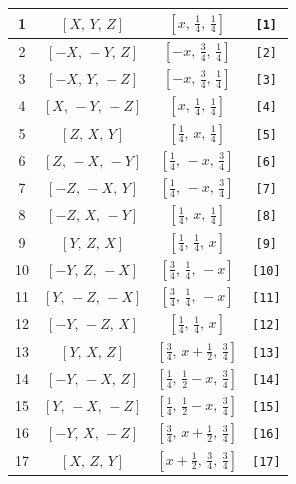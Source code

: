 \documentclass[fleqn,8pt]{jsarticle}
\begin{document}
\begin{longtable}{cccc}
1 & $\left[ X,\, Y,\, Z \right]$ & $\left[ x,\, \frac{1}{4},\, \frac{1}{4} \right]$ & {\tt [1]} \\ \hline
2 & $\left[ - X,\, - Y,\, Z \right]$ & $\left[ - x,\, \frac{3}{4},\, \frac{1}{4} \right]$ & {\tt [2]} \\ \hline
3 & $\left[ - X,\, Y,\, - Z \right]$ & $\left[ - x,\, \frac{3}{4},\, \frac{1}{4} \right]$ & {\tt [3]} \\ \hline
4 & $\left[ X,\, - Y,\, - Z \right]$ & $\left[ x,\, \frac{1}{4},\, \frac{1}{4} \right]$ & {\tt [4]} \\ \hline
5 & $\left[ Z,\, X,\, Y \right]$ & $\left[ \frac{1}{4},\, x,\, \frac{1}{4} \right]$ & {\tt [5]} \\ \hline
6 & $\left[ Z,\, - X,\, - Y \right]$ & $\left[ \frac{1}{4},\, - x,\, \frac{3}{4} \right]$ & {\tt [6]} \\ \hline
7 & $\left[ - Z,\, - X,\, Y \right]$ & $\left[ \frac{1}{4},\, - x,\, \frac{3}{4} \right]$ & {\tt [7]} \\ \hline
8 & $\left[ - Z,\, X,\, - Y \right]$ & $\left[ \frac{1}{4},\, x,\, \frac{1}{4} \right]$ & {\tt [8]} \\ \hline
9 & $\left[ Y,\, Z,\, X \right]$ & $\left[ \frac{1}{4},\, \frac{1}{4},\, x \right]$ & {\tt [9]} \\ \hline
10 & $\left[ - Y,\, Z,\, - X \right]$ & $\left[ \frac{3}{4},\, \frac{1}{4},\, - x \right]$ & {\tt [10]} \\ \hline
11 & $\left[ Y,\, - Z,\, - X \right]$ & $\left[ \frac{3}{4},\, \frac{1}{4},\, - x \right]$ & {\tt [11]} \\ \hline
12 & $\left[ - Y,\, - Z,\, X \right]$ & $\left[ \frac{1}{4},\, \frac{1}{4},\, x \right]$ & {\tt [12]} \\ \hline
13 & $\left[ Y,\, X,\, Z \right]$ & $\left[ \frac{3}{4},\, x + \frac{1}{2},\, \frac{3}{4} \right]$ & {\tt [13]} \\ \hline
14 & $\left[ - Y,\, - X,\, Z \right]$ & $\left[ \frac{1}{4},\, \frac{1}{2} - x,\, \frac{3}{4} \right]$ & {\tt [14]} \\ \hline
15 & $\left[ Y,\, - X,\, - Z \right]$ & $\left[ \frac{1}{4},\, \frac{1}{2} - x,\, \frac{3}{4} \right]$ & {\tt [15]} \\ \hline
16 & $\left[ - Y,\, X,\, - Z \right]$ & $\left[ \frac{3}{4},\, x + \frac{1}{2},\, \frac{3}{4} \right]$ & {\tt [16]} \\ \hline
17 & $\left[ X,\, Z,\, Y \right]$ & $\left[ x + \frac{1}{2},\, \frac{3}{4},\, \frac{3}{4} \right]$ & {\tt [17]} \\ \hline

\end{longtable}
\end{document}
